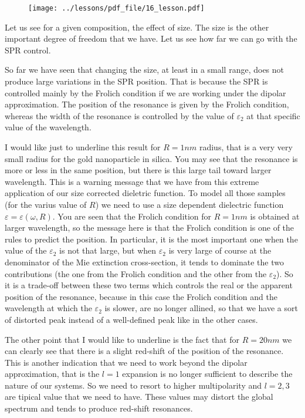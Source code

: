 \documentclass[../main/main.tex]{subfiles}
\begin{document}
\begin{figure}[h!]
\centering
\texttt{[image: ../lessons/pdf\_file/16\_lesson.pdf]}
\end{figure}

Let us see for a given composition, the effect of size. The size is the other important degree of freedom that we have. Let us see how far we can go with the SPR control.

So far we have seen that changing the size, at least in a small range, does not produce large variations in the SPR position. That is because the SPR is controlled mainly by the Frolich condition if we are working under the dipolar approximation. The position of the resonance is given by the Frolich condition, whereas the width of the resonance is controlled by the value of \( \varepsilon _2 \) at that specific value of the wavelength.

I would like just to underline this result for \( R=1nm \) radius, that is a very very small radius for the gold nanoparticle in silica. You may see that the resonance is more or less in the same position, but there is this large tail toward larger wavelength. This is a warning message that we have from this extreme application of our size corrected dieletric function. To model all those samples (for the varius value of \( R \)) we need to use a size dependent dielectric function \( \varepsilon = \varepsilon (\omega ,R) \). You are seen that the Frolich condition for \( R=1nm \) is obtained at larger wavelength, so the message here is that the Frolich condition is one of the rules to predict the position. In particular, it is the most important one when the value of the \( \varepsilon _2 \) is not that large, but when \( \varepsilon _2 \) is very large of course at the denominator of the Mie extinction cross-section, it tends to dominate the two contributions (the one from the Frolich condition and the other from the \( \varepsilon _2 \)). So it is a trade-off between these two terms which controls the real or the apparent position of the resonance, because in this case the Frolich condition and the wavelength at which the \( \varepsilon_2 \) is slower, are no longer allined, so that we have a sort of distorted peak instead of a well-defined peak like in the other cases.

The other point that I would like to underline is the fact that for \( R=20nm \) we can clearly see that there is a slight red-shift of the position of the resonance. This is another indication that we need to work beyond the dipolar approximation, that is the \( l=1 \) expansion is no longer sufficient to describe the nature of our systems. So we need to resort to higher multipolarity and \( l=2,3 \) are tipical value that we need to have. These values may distort the global spectrum and tends to produce red-shift resonances.
\end{document}

